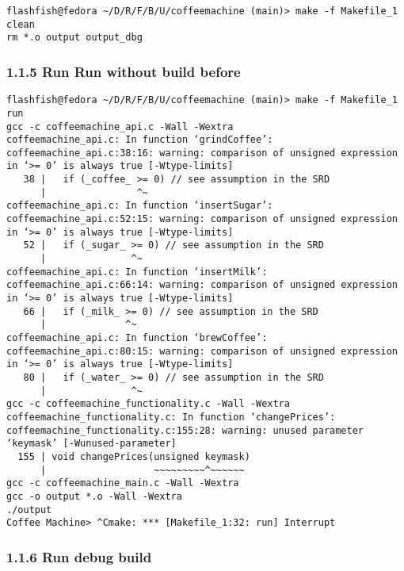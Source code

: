 \documentclass{report}
\begin{document}
\begin{lstlisting}[style=cppstyle, title=\texttt{Terminal Output}]
flashfish@fedora ~/D/R/F/B/U/coffeemachine (main)> make -f Makefile_1 clean
rm *.o output output_dbg
\end{lstlisting}


\subsubsection*{1.1.5 Run Run without build before}

\begin{lstlisting}[style=cppstyle, title=\texttt{Terminal Output}]
flashfish@fedora ~/D/R/F/B/U/coffeemachine (main)> make -f Makefile_1 run
gcc -c coffeemachine_api.c -Wall -Wextra
coffeemachine_api.c: In function ‘grindCoffee’:
coffeemachine_api.c:38:16: warning: comparison of unsigned expression in ‘>= 0’ is always true [-Wtype-limits]
   38 |   if (_coffee_ >= 0) // see assumption in the SRD
      |                ^~
coffeemachine_api.c: In function ‘insertSugar’:
coffeemachine_api.c:52:15: warning: comparison of unsigned expression in ‘>= 0’ is always true [-Wtype-limits]
   52 |   if (_sugar_ >= 0) // see assumption in the SRD
      |               ^~
coffeemachine_api.c: In function ‘insertMilk’:
coffeemachine_api.c:66:14: warning: comparison of unsigned expression in ‘>= 0’ is always true [-Wtype-limits]
   66 |   if (_milk_ >= 0) // see assumption in the SRD
      |              ^~
coffeemachine_api.c: In function ‘brewCoffee’:
coffeemachine_api.c:80:15: warning: comparison of unsigned expression in ‘>= 0’ is always true [-Wtype-limits]
   80 |   if (_water_ >= 0) // see assumption in the SRD
      |               ^~
gcc -c coffeemachine_functionality.c -Wall -Wextra
coffeemachine_functionality.c: In function ‘changePrices’:
coffeemachine_functionality.c:155:28: warning: unused parameter ‘keymask’ [-Wunused-parameter]
  155 | void changePrices(unsigned keymask)
      |                   ~~~~~~~~~^~~~~~~
gcc -c coffeemachine_main.c -Wall -Wextra
gcc -o output *.o -Wall -Wextra
./output
Coffee Machine> ^Cmake: *** [Makefile_1:32: run] Interrupt
\end{lstlisting}

\subsubsection*{1.1.6 Run debug build}
\end{document}
